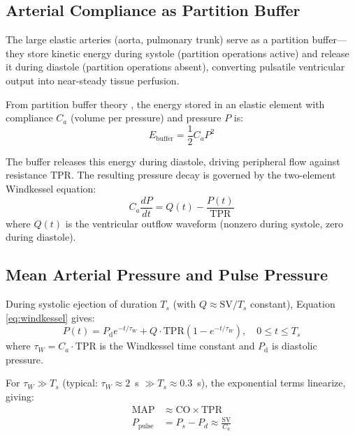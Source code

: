 \documentclass[10pt,twocolumn,a4paper]{article}
\theoremstyle{remark}
\newcommand{\CO}{\mathrm{CO}}
\newcommand{\SV}{\mathrm{SV}}
\newcommand{\MAP}{\mathrm{MAP}}
\newcommand{\TPR}{\mathrm{TPR}}
\begin{document}
\subsection{Arterial Compliance as Partition Buffer}

The large elastic arteries (aorta, pulmonary trunk) serve as a partition buffer—they store kinetic energy during systole (partition operations active) and release it during diastole (partition operations absent), converting pulsatile ventricular output into near-steady tissue perfusion.

From partition buffer theory \cite{sachikonye2024transport}, the energy stored in an elastic element with compliance $C_a$ (volume per pressure) and pressure $P$ is:
\begin{equation}
    E_{\mathrm{buffer}} = \frac{1}{2} C_a P^2
\end{equation}

The buffer releases this energy during diastole, driving peripheral flow against resistance $\TPR$. The resulting pressure decay is governed by the two-element Windkessel equation:
\begin{equation}
    C_a \frac{dP}{dt} = Q(t) - \frac{P(t)}{\TPR}
    \label{eq:windkessel}
\end{equation}
where $Q(t)$ is the ventricular outflow waveform (nonzero during systole, zero during diastole).

\subsection{Mean Arterial Pressure and Pulse Pressure}

During systolic ejection of duration $T_s$ (with $Q \approx \SV / T_s$ constant), Equation \ref{eq:windkessel} gives:
\begin{equation}
    P(t) = P_{\mathrm{d}} e^{-t/\tau_W} + Q \cdot \TPR \left(1 - e^{-t/\tau_W}\right), \quad 0 \leq t \leq T_s
\end{equation}
where $\tau_W = C_a \cdot \TPR$ is the Windkessel time constant and $P_{\mathrm{d}}$ is diastolic pressure.

For $\tau_W \gg T_s$ (typical: $\tau_W \approx 2$~s $\gg T_s \approx 0.3$~s), the exponential terms linearize, giving:
\begin{align}
    \MAP &\approx \CO \times \TPR \label{eq:map_from_windkessel} \\
    P_{\mathrm{pulse}} &= P_s - P_d \approx \frac{\SV}{C_a} \label{eq:pulse_pressure}
\end{align}
\end{document}
